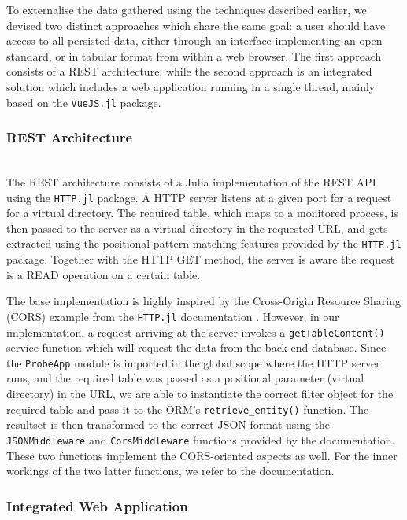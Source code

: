 \documentclass{juliacon}
\begin{document}
To externalise the data gathered using the techniques described earlier, we devised two distinct approaches which share the same goal: a user should have access to all persisted data, either through an interface implementing an open standard, or in tabular format from within a web browser. The first approach consists of a REST architecture, while the second approach is an integrated solution which includes a web application running in a single thread, mainly based on the \texttt{VueJS.jl} package. \vskip 6pt


\subsubsection{REST Architecture}\hfill\\

The REST architecture consists of a Julia implementation of the REST API using the \texttt{HTTP.jl} package. A HTTP server listens at a given port for a request for a virtual directory. The required table, which maps to a monitored process, is then passed to the server as a virtual directory in the requested URL, and gets extracted using the positional pattern matching features provided by the \texttt{HTTP.jl} package. Together with the HTTP GET method, the server is aware the request is a READ operation on a certain table.\vskip 6pt

The base implementation is highly inspired by the Cross-Origin Resource Sharing (CORS) example from the \texttt{HTTP.jl} documentation \cite{httpjl}. However, in our implementation, a request arriving at the server invokes a \texttt{getTableContent()} service function which will request the data from the back-end database. Since the \texttt{ProbeApp} module is imported in the global scope where the HTTP server runs, and the required table was passed as a positional parameter (virtual directory) in the URL, we are able to instantiate the correct filter object for the required table and pass it to the ORM's \texttt{retrieve\_entity()} function. The resultset is then transformed to the correct JSON format using the \texttt{JSONMiddleware} and \texttt{CorsMiddleware} functions provided by the documentation. These two functions implement the CORS-oriented aspects as well. For the inner workings of the two latter functions, we refer to the documentation.\vskip 6pt

\subsubsection{Integrated Web Application}\hfill\\
\end{document}
